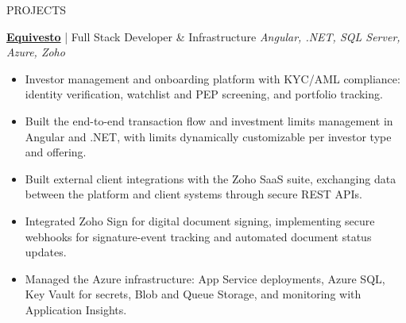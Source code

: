 \documentclass{resume} %
\begin{document}

\begin{rSection}{PROJECTS}

\textbf{\href{https://equivesto-issuercrm-webapp-dev.azurewebsites.net/}{Equivesto}} | Full Stack Developer \& Infrastructure \hfill \textit{Angular, .NET, SQL Server, Azure, Zoho}
\begin{itemize}
    \itemsep -3pt {}
    \item Investor management and onboarding platform with KYC/AML compliance: identity verification, watchlist and PEP screening, and portfolio tracking.
    \item Built the end-to-end transaction flow and investment limits management in Angular and .NET, with limits dynamically customizable per investor type and offering.
    \item Built external client integrations with the Zoho SaaS suite, exchanging data between the platform and client systems through secure REST APIs.
    \item Integrated Zoho Sign for digital document signing, implementing secure webhooks for signature-event tracking and automated document status updates.
    \item Managed the Azure infrastructure: App Service deployments, Azure SQL, Key Vault for secrets, Blob and Queue Storage, and monitoring with Application Insights.
\end{itemize}


\end{rSection}
\end{document}
